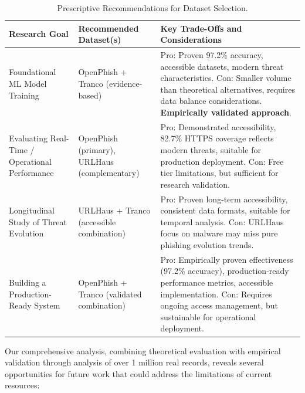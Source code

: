 \documentclass[journal,article,submit,pdftex,moreauthors]{Definitions/mdpi}
\begin{document}
\begin{table}[H]
\caption{Prescriptive Recommendations for Dataset Selection.\label{tab:recommendations}}
\begin{tabularx}{\textwidth}{lXX}
\toprule
\textbf{Research Goal} & \textbf{Recommended Dataset(s)} & \textbf{Key Trade-Offs and Considerations}\\
\midrule
Foundational ML Model Training & OpenPhish + Tranco (evidence-based) & Pro: Proven 97.2\% accuracy, accessible datasets, modern threat characteristics. Con: Smaller volume than theoretical alternatives, requires data balance considerations. \textbf{Empirically validated approach}.\\
Evaluating Real-Time / Operational Performance & OpenPhish (primary), URLHaus (complementary) & Pro: Demonstrated accessibility, 82.7\% HTTPS coverage reflects modern threats, suitable for production deployment. Con: Free tier limitations, but sufficient for research validation.\\
Longitudinal Study of Threat Evolution & URLHaus + Tranco (accessible combination) & Pro: Proven long-term accessibility, consistent data formats, suitable for temporal analysis. Con: URLHaus focus on malware may miss pure phishing evolution trends.\\
Building a Production-Ready System & OpenPhish + Tranco (validated combination) & Pro: Empirically proven effectiveness (97.2\% accuracy), production-ready performance metrics, accessible implementation. Con: Requires ongoing access management, but sustainable for operational deployment.\\
\bottomrule
\end{tabularx}
\end{table}

Our comprehensive analysis, combining theoretical evaluation with empirical validation through analysis of over 1 million real records, reveals several opportunities for future work that could address the limitations of current resources:
\end{document}
